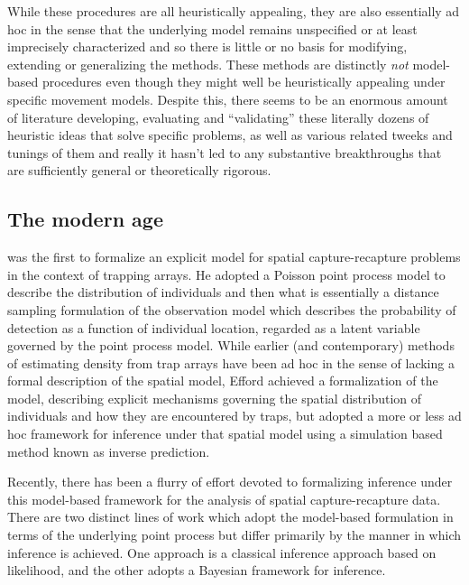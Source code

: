 While these procedures are all heuristically appealing, they are also
essentially ad hoc in the sense that the underlying model remains
unspecified or at least imprecisely characterized and so there is
little or no basis for modifying, extending or generalizing the
methods. These methods are distinctly {\it not} model-based procedures
even though they might well be heuristically appealing under specific
movement models. Despite this, there seems to be an enormous amount of
literature developing, evaluating and ``validating'' these literally
dozens of heuristic ideas that solve specific problems, as well as
various related tweeks and tunings of them and really it hasn't led to
any substantive breakthroughs that are sufficiently general or
theoretically rigorous.


\subsection{The modern age}

\citet{efford:2004} was the first to formalize an explicit model for
spatial capture-recapture problems in the context of trapping arrays.
He adopted a Poisson point process model to describe the distribution
of individuals and then what is essentially a distance sampling
formulation of the observation model which describes the probability
of detection as a function of individual location, regarded as a
latent variable governed by the point process model. While earlier
(and contemporary) methods of estimating density from trap arrays have
been ad hoc in the sense of lacking a formal description of the
spatial model, Efford achieved a formalization of the model,
describing explicit mechanisms governing the spatial distribution of
individuals and how they are encountered by traps, but
adopted a more or less ad hoc framework for inference under that
spatial model using a simulation based method known as inverse
prediction.

Recently, there has been a flurry of effort devoted to formalizing
inference under this model-based framework for the analysis of spatial
capture-recapture data. There are two distinct lines of work which
adopt the model-based formulation in terms of the underlying point
process but differ primarily by the manner in which inference is
achieved. One approach \citep{borchers_efford:2008} is a classical inference approach based on
likelihood, and the other \citep{royle_young:2008} adopts a
Bayesian framework for inference. 

